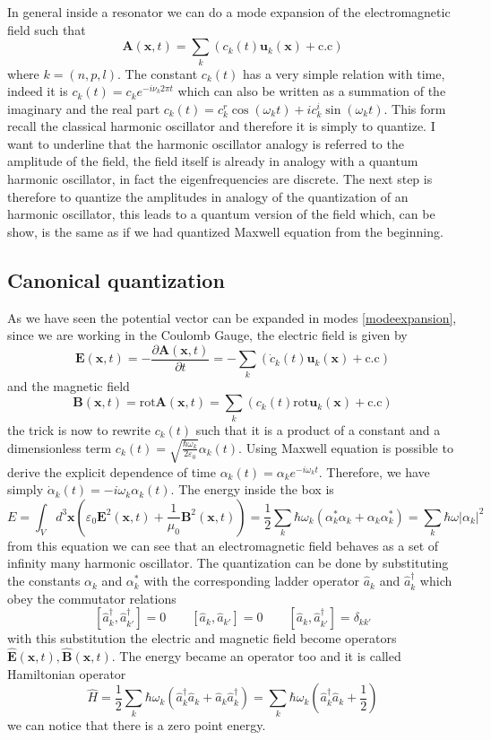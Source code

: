 \documentclass[12pt]{article}
\theoremstyle{plain}
\newcommand{\x}{\mathbf{x}}
\theoremstyle{definition}
\theoremstyle{remark}
\begin{document}
In general inside a resonator we can do a mode expansion of the electromagnetic field such that
\begin{equation}\label{modeexpansion}\mathbf{A}(\x,t) = \sum_{k}\left( c_k(t)\mathbf{u}_k (\x) + \text{c.c}\right)\end{equation}
where $k = (n,p,l)$. The constant $c_k(t)$ has a very simple relation with time, indeed it is $c_k(t) = c_ke^{-i\nu_k 2\pi t}$
which can also be written as a summation of the imaginary and the real part $c_k(t) = c_k^r \cos(\omega_kt) + i c_k^i \sin(\omega_k t)$. This form recall the classical harmonic oscillator and therefore it is simply to quantize. I want to underline that the harmonic oscillator analogy is referred to the amplitude of the field, the field itself is already in analogy with a quantum harmonic oscillator, in fact the eigenfrequencies are discrete. The next step is therefore to quantize the amplitudes in analogy of the quantization of an harmonic oscillator, this leads to a quantum version of the field which, can be show, is the same as if we had quantized Maxwell equation from the beginning.
\subsection{Canonical quantization}
As we have seen the potential vector can be expanded in modes \eqref{modeexpansion}, since we are working in the Coulomb Gauge, the electric field is given by
\[\mathbf{E}(\x,t) = -\frac{\partial \mathbf{A}(\x,t)}{\partial t} = -\sum_{k}\left( \dot{c}_k(t)\mathbf{u}_k (\x) + \text{c.c}\right)\]
and the magnetic field
\[\mathbf{B}(\x,t) = \text{rot}\mathbf{A}(\x,t) = \sum_{k}\left( c_k(t)\text{rot}\mathbf{u}_k (\x) + \text{c.c}\right)\]
the trick is now to rewrite $c_k(t)$ such that it is a product of a constant and a dimensionless term $c_k(t) = \sqrt{\frac{\hbar \omega_{k}}{2\varepsilon_0}} \alpha_k(t)$. Using Maxwell equation is possible to derive the explicit dependence of time $\alpha_k(t) = \alpha_ke^{-i\omega_k t}$. Therefore, we have simply $\dot{\alpha}_k(t) = -i\omega_k\alpha_k(t)$.
The energy inside the box is
\[E = \int_V d^3\x\left(\varepsilon_0 \mathbf{E}^2(\x,t)+\frac{1}{\mu_0}\mathbf{B}^2(\x,t)\right) = \frac{1}{2}\sum_k \hbar \omega_k (\alpha_k^*\alpha_k + \alpha_k\alpha_k^*) = \sum_k\hbar \omega |\alpha_k|^2\]
from this equation we can see that an electromagnetic field behaves as a set of infinity many harmonic oscillator. The quantization can be done by substituting the constants $\alpha_k$ and $\alpha_k^*$ with the corresponding ladder operator $\hat{a}_k$ and $\hat{a}_k^\dagger$ which obey the commutator relations
\[[\hat{a}_k^\dagger,\hat{a}_{k'}^\dagger] = 0\qquad [\hat{a}_k,\hat{a}_{k'}] = 0 \qquad [\hat{a}_k,\hat{a}_{k'}^\dagger] = \delta_{kk'}   \]
with this substitution the electric and magnetic field become operators $\hat{\mathbf{E}}(\x,t),\hat{\mathbf{B}}(\x,t)$. The energy became an operator too and it is called Hamiltonian operator 
\[\hat{H} = \frac{1}{2}\sum_k \hbar \omega_k (\hat{a}_k^\dagger\hat{a}_k + \hat{a}_k\hat{a}_k^\dagger) = \sum_k \hbar \omega_k \left(\hat{a}_k^\dagger\hat{a}_k + \frac{1}{2}\right)\]
we can notice that there is a zero point energy.
\end{document}
